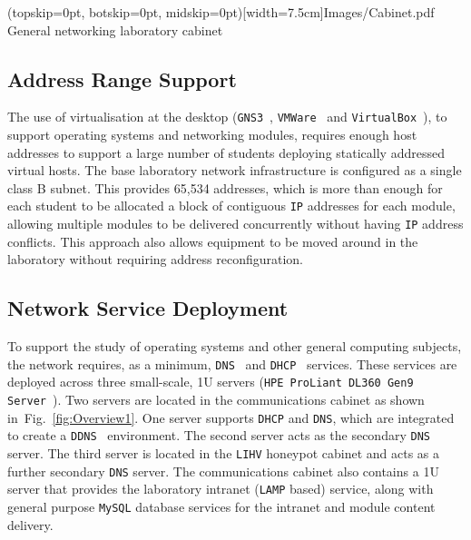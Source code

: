 \documentclass{ieeeaccess}
\begin{document}
\Figure[t!](topskip=0pt, botskip=0pt, midskip=0pt)[width=7.5cm]{Images/Cabinet.pdf}
{General networking laboratory cabinet\label{fig:Cabinet}}



\subsection{Address Range Support}

The use of virtualisation at the desktop (\texttt{GNS3}~\cite{GNS3:17},
\texttt{VMWare}~\cite{VMWARE:17} and \texttt{VirtualBox}~\cite{O:17}), to
support operating systems and networking modules, requires enough
host addresses to support a large number of students deploying statically
addressed virtual hosts. The base laboratory network infrastructure is
configured as a single class B subnet.  This provides 65,534 addresses, which
is more than enough for each student to be allocated a block of contiguous
\texttt{IP} addresses for each module, allowing multiple modules to be
delivered concurrently without having \texttt{IP} address conflicts.  This
approach also allows equipment to be moved around in the laboratory without
requiring address reconfiguration.

\subsection{Network Service Deployment}\label{InfraService}

To support the study of operating systems and other general computing subjects,
the network requires, as a minimum, \texttt{DNS}~\cite{RA:11} and
\texttt{DHCP}~\cite{DL:02} services. These services are deployed across three
small-scale, 1U servers (\texttt{HPE ProLiant DL360 Gen9
Server}~\cite{HPE:17}). Two servers are located in the communications cabinet
as shown in~Fig.~\ref{fig:Overview1}. One server supports \texttt{DHCP} and
\texttt{DNS}, which are integrated to create a \texttt{DDNS}~\cite{SV:06}
environment. The second server acts as the secondary \texttt{DNS} server. The
third server is located in the \texttt{LIHV} honeypot cabinet and acts as a
further secondary \texttt{DNS} server.  The communications cabinet also
contains a 1U server that provides the laboratory intranet (\texttt{LAMP}
based) service, along with general purpose \texttt{MySQL} database services for
the intranet and module content delivery.
\end{document}
